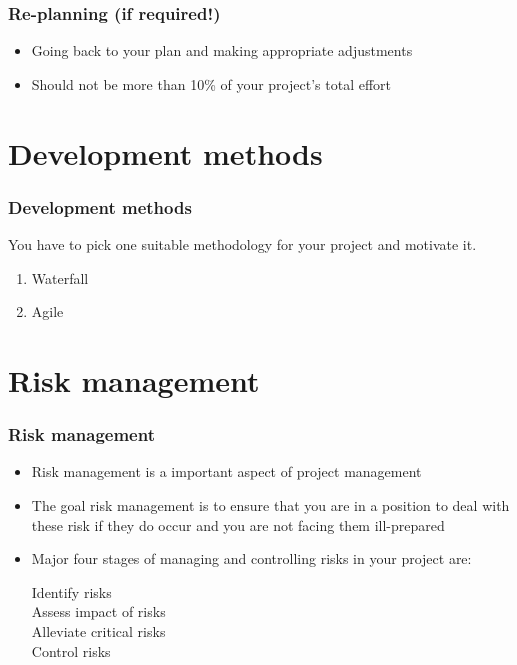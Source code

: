 \begin{frame}[t]\frametitle{Re-planning (if required!)}
\begin{itemize}
    	\item Going back to your plan and making appropriate adjustments
    	\item Should not be more than 10\% of your project's total effort
    \end{itemize}
\end{frame}

\section{Development methods} %
\label{sec:development_methods}
\begin{frame}[t]\frametitle{Development methods}
You have to pick one suitable methodology for your project and motivate it.
\begin{enumerate}
    \item Waterfall
     \item Agile
\end{enumerate}
\end{frame}

\section{Risk management} %
\label{sec:risk_management}
\begin{frame}[t]\frametitle{Risk management}
    \begin{itemize}
    	\item Risk management is a important aspect of project management
    	\item The goal risk management is to ensure that you are in a position to deal with these risk if they do occur and you are not facing them ill-prepared
    	\item Major four stages of managing and controlling risks in your project are:
    	\begin{description}
    		\item[Identify risks]
    		\item[Assess impact of risks]
    		\item[Alleviate critical risks]
    		\item[Control risks]
    	\end{description}
    \end{itemize}
\end{frame}

